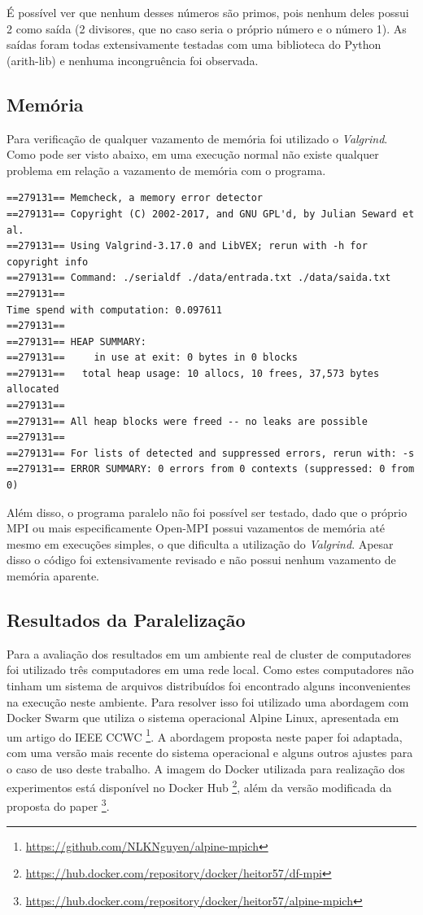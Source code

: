 \documentclass[12pt]{article}
\begin{document}
É possível ver que nenhum desses números são primos, pois nenhum deles possui 2 como saída (2 divisores, que no caso seria o próprio número e o número 1). As saídas foram todas extensivamente testadas com uma biblioteca do Python (arith-lib) e nenhuma incongruência foi observada.

\subsection{Memória}

Para verificação de qualquer vazamento de memória foi utilizado o \textit{Valgrind}. Como pode ser visto abaixo, em uma execução normal não existe qualquer problema em relação a vazamento de memória com o programa.

	{
		\scriptsize
		\begin{verbatim}
==279131== Memcheck, a memory error detector
==279131== Copyright (C) 2002-2017, and GNU GPL'd, by Julian Seward et al.
==279131== Using Valgrind-3.17.0 and LibVEX; rerun with -h for copyright info
==279131== Command: ./serialdf ./data/entrada.txt ./data/saida.txt
==279131== 
Time spend with computation: 0.097611
==279131== 
==279131== HEAP SUMMARY:
==279131==     in use at exit: 0 bytes in 0 blocks
==279131==   total heap usage: 10 allocs, 10 frees, 37,573 bytes allocated
==279131== 
==279131== All heap blocks were freed -- no leaks are possible
==279131== 
==279131== For lists of detected and suppressed errors, rerun with: -s
==279131== ERROR SUMMARY: 0 errors from 0 contexts (suppressed: 0 from 0)
\end{verbatim}
	}

Além disso, o programa paralelo não foi possível ser testado, dado que o próprio MPI ou mais especificamente Open-MPI possui vazamentos de memória até mesmo em execuções simples, o que dificulta a utilização do \textit{Valgrind}. Apesar disso o código foi extensivamente revisado e não possui nenhum vazamento de memória aparente.

\subsection{Resultados da Paralelização}

Para a avaliação dos resultados em um ambiente real de cluster de computadores foi utilizado três computadores em uma rede local. Como estes computadores não tinham um sistema de arquivos distribuídos foi encontrado alguns inconvenientes na execução neste ambiente. Para resolver isso foi utilizado uma abordagem com Docker Swarm que utiliza o sistema operacional Alpine Linux, apresentada em um artigo do IEEE CCWC \cite{nguyen2017distributed}\footnote{\url{https://github.com/NLKNguyen/alpine-mpich}}. A abordagem proposta neste paper foi adaptada, com uma versão mais recente do sistema operacional e alguns outros ajustes para o caso de uso deste trabalho. A imagem do Docker utilizada para realização dos experimentos está disponível no Docker Hub \footnote{\url{https://hub.docker.com/repository/docker/heitor57/df-mpi}}, além da versão modificada da proposta do paper \footnote{\url{https://hub.docker.com/repository/docker/heitor57/alpine-mpich}}.
\end{document}
